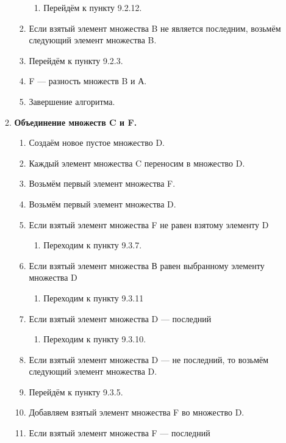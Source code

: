 \documentclass[a4paper,12pt]{extarticle}
\begin{document}
\begin{enumerate}
\begin{enumerate}[label*=\arabic*.]
\begin{enumerate}[label*=\arabic*.]
\begin{enumerate}[label*=\arabic*.]
        \item Перейдём к пункту 9.2.12.
      \end{enumerate}
      \item Если взятый элемент множества B не является последним, возьмём следующий элемент множества B.
      \item Перейдём к пункту 9.2.3.
      \item F — разность множеств B и А.
      \item Завершение алгоритма.
    \end{enumerate}
    \item\textbf{Объединение множеств C и F.}
    \begin{enumerate}[label*=\arabic*.]
      \item Создаём новое пустое множество D.
      \item Каждый элемент множества C переносим в множество D.
      \item Возьмём первый элемент множества F.
      \item Возьмём первый элемент множества D.
      \item Если взятый элемент множества F не равен взятому элементу D
      \begin{enumerate}[label*=\arabic*.]
        \item Переходим к пункту 9.3.7.
      \end{enumerate}
      \item Если взятый элемент множества В равен выбранному элементу множества D
      \begin{enumerate}[label*=\arabic*.]
        \item Переходим к пункту 9.3.11
      \end{enumerate}
      \item Если взятый элемент множества D — последний
      \begin{enumerate}[label*=\arabic*.]
        \item Переходим к пункту 9.3.10.
      \end{enumerate}
      \item Если взятый элемент множества D — не последний, то возьмём следующий элемент множества D.
      \item Перейдём к пункту 9.3.5.
      \item Добавляем взятый элемент множества F во множество D.
      \item Если взятый элемент множества F — последний
      \begin{enumerate}[label*=\arabic*.]

\end{enumerate}
\end{enumerate}
\end{enumerate}
\end{enumerate}
\end{document}
